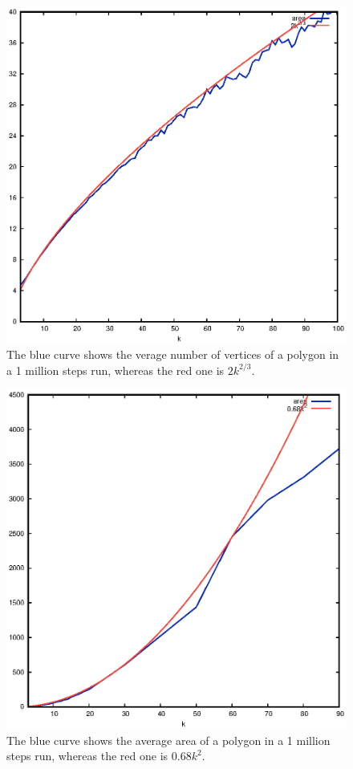 \begin{figure}[h]
  \centering
  \includegraphics[scale=0.7]{npoint_lim}
  \caption{The blue curve shows the verage number of vertices of a polygon in a 1 million steps run, whereas the red one is $2k^{2/3}$.}
  \label{Fig.Nlim}
\end{figure}

\begin{figure}[h]
  \centering
  \includegraphics[scale=0.7]{volume_lim}
  \caption{The blue curve shows the average area of a polygon in a 1 million steps run, whereas the red one is $0.68k^2$.}
  \label{Fig.Vlim}
\end{figure}
